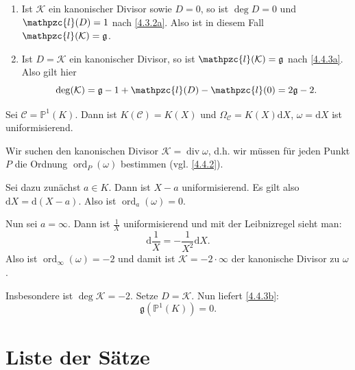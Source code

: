 \documentclass[a4paper,12pt,index=toc]{scrbook}
\theoremstyle{keinenummern} %
\def\CC{\mathcal{C}}
\def\P{\mathbb{P}}
\renewcommand{\d}{\mathrm{d}}
\newcommand{\K}{\mathcal{K}}
\newcommand{\g}{\mathfrak{g}}
\def\ll{\mathpzc{l}}
\renewcommand{\div}{\operatorname{div}}
\newcommand{\ord}{\operatorname{ord}}
\begin{document}
\begin{kor}\label{4.4.3} \begin{enumerate}
  \item{} Ist $\K$ ein kanonischer Divisor sowie $D=0$, so ist $\deg D=0$ und $\ll(D)=1$ nach \cref{4.3.2a}. Also ist in diesem Fall $\ll(\K)=\g$.
  \item{} Ist $D=\K$ ein kanonischer Divisor, so ist $\ll(\K)=\g$ nach \ref{4.4.3a}. Also gilt hier \begin{equation*}\deg (\K)=\g-1+\ll(D)-\ll(0)=2\g-2.\end{equation*}
 \end{enumerate}
\end{kor}
\begin{bsp}\label{4.4.4}
Sei $\CC=\P^1(K)$. Dann ist $K(\CC)=K(X)$ und $\Omega_{\CC}=K(X)\d X$, $\omega=\d X$ ist uniformisierend.

Wir suchen den kanonischen Divisor $\K=\div \omega$, d.h. wir müssen für jeden Punkt $P$ die Ordnung $\ord_P(\omega)$ bestimmen (vgl. \cref{4.4.2}).

Sei dazu zunächst $a\in K$. Dann ist $X-a$ uniformisierend. Es gilt also $\d X=\d (X-a)$. Also ist $\ord_a (\omega)=0$.

Nun sei $a=\infty$. Dann ist $\frac{1}{X}$ uniformisierend und mit der Leibnizregel sieht man: \begin{equation*}\d\frac{1}{X}=-\frac{1}{X^2} \d X.\end{equation*}
Also ist $\ord_{\infty}(\omega)=-2$ und damit ist $\K=-2\cdot \infty$ der kanonische Divisor zu $\omega$. 

Insbesondere ist $\deg \K=-2$. Setze $D=\K$. Nun liefert \cref{4.4.3b}: \begin{equation*}\g(\P^1(K))=0.\end{equation*} 
\end{bsp}

\chapter{Liste der Sätze}


\renewcommand\indexname{Stichwortverzeichnis}
\printindex
\end{document}
